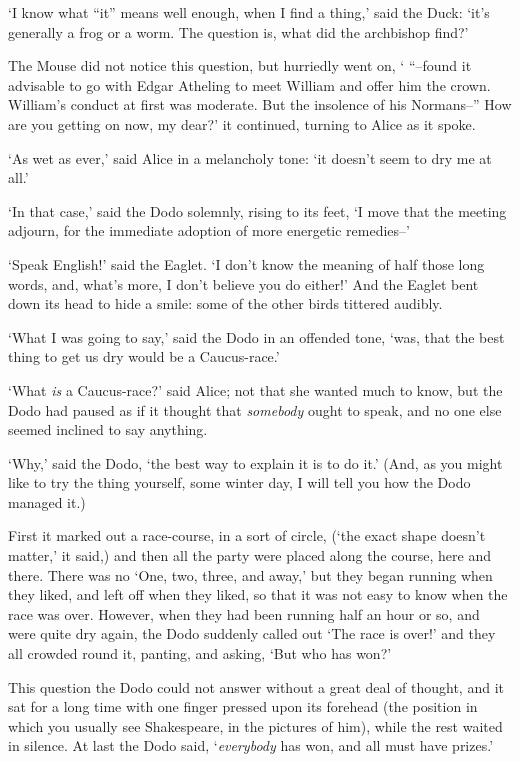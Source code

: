   `I know what ``it'' means well enough, when I find a thing,' said
the Duck:  `it's generally a frog or a worm.  The question is,
what did the archbishop find?'

  The Mouse did not notice this question, but hurriedly went on,
` ``--found it advisable to go with Edgar Atheling to meet William
and offer him the crown.  William's conduct at first was
moderate.  But the insolence of his Normans--''  How are you
getting on now, my dear?' it continued, turning to Alice as it
spoke.

  `As wet as ever,' said Alice in a melancholy tone:  `it doesn't
seem to dry me at all.'

  `In that case,' said the Dodo solemnly, rising to its feet, `I
move that the meeting adjourn, for the immediate adoption of more
energetic remedies--'

  `Speak English!' said the Eaglet.  `I don't know the meaning of
half those long words, and, what's more, I don't believe you do
either!'  And the Eaglet bent down its head to hide a smile:
some of the other birds tittered audibly.

  `What I was going to say,' said the Dodo in an offended tone,
`was, that the best thing to get us dry would be a Caucus-race.'

  `What {\it is} a Caucus-race?' said Alice; not that she wanted much
to know, but the Dodo had paused as if it thought that {\it somebody}
ought to speak, and no one else seemed inclined to say anything.

  `Why,' said the Dodo, `the best way to explain it is to do it.'
(And, as you might like to try the thing yourself, some winter
day, I will tell you how the Dodo managed it.)

  First it marked out a race-course, in a sort of circle, (`the
exact shape doesn't matter,' it said,) and then all the party
were placed along the course, here and there.  There was no `One,
two, three, and away,' but they began running when they liked,
and left off when they liked, so that it was not easy to know
when the race was over.  However, when they had been running half
an hour or so, and were quite dry again, the Dodo suddenly called
out `The race is over!' and they all crowded round it, panting,
and asking, `But who has won?'

  This question the Dodo could not answer without a great deal of
thought, and it sat for a long time with one finger pressed upon
its forehead (the position in which you usually see Shakespeare,
in the pictures of him), while the rest waited in silence.  At
last the Dodo said, `{\it everybody} has won, and all must have
prizes.'

